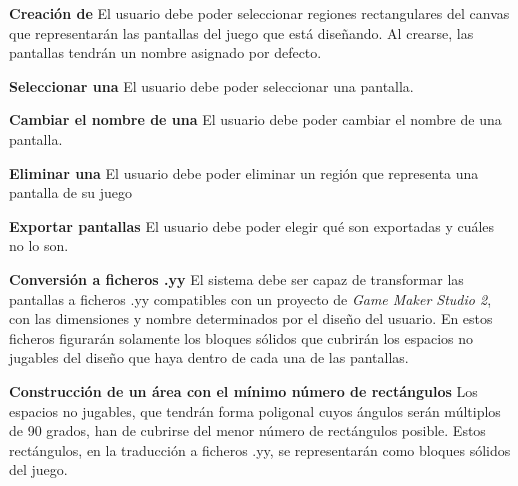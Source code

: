 	\item \textbf{Creación de }\newline
		El usuario debe poder seleccionar regiones rectangulares del canvas que representarán las pantallas del juego que está diseñando. Al crearse, las pantallas tendrán un nombre asignado por defecto.
	\item \textbf{Seleccionar una }\newline
		El usuario debe poder seleccionar una pantalla.
	\item \textbf{Cambiar el nombre de una }\newline
		El usuario debe poder cambiar el nombre de una pantalla.
	\item \textbf{Eliminar una }\newline
		El usuario debe poder eliminar un región que representa una pantalla de su juego
	\item \textbf{Exportar pantallas}\newline
		El usuario debe poder elegir qué  son exportadas y cuáles no lo son.
	\item\label{PARTICULAR:REQUISITO31} \textbf{Conversión a ficheros .yy}\newline
		El sistema debe ser capaz de transformar las pantallas a ficheros .yy compatibles con un proyecto de \textit{Game Maker Studio 2}, con las dimensiones y nombre determinados por el diseño del usuario. En estos ficheros figurarán solamente los bloques sólidos que cubrirán los espacios no jugables del diseño que haya dentro de cada una de las pantallas.
		\begin{functional}
			\item \textbf{Construcción de un área con el mínimo número de rectángulos}\newline
				Los espacios no jugables, que tendrán forma poligonal cuyos ángulos serán múltiplos de 90 grados, han de cubrirse del menor número de rectángulos posible. Estos rectángulos, en la traducción a ficheros .yy, se representarán como bloques sólidos del juego.
		\end{functional}
